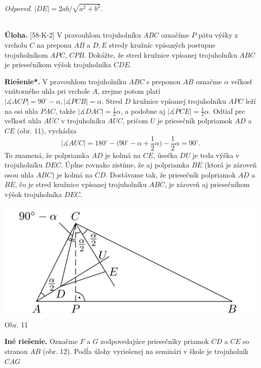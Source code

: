 \documentclass[11pt,a4paper,oneside,final]{book}
\newcommand{\ul}{\textbf{Úloha.} }
\newcommand{\rieh}{\textbf{Riešenie*.} }
\newcommand{\ma}{\measuredangle}
\begin{document}
\textit{Odpoveď.} $|DE| = 2ab/\sqrt{a^2 + b^2}$.\\
\\
\begin{tcolorbox}[breakable,notitle,boxrule=0pt,colback=light-gray,colframe=light-gray]\ul [58-K-2]
V pravouhlom trojuholníku $ABC$ označíme $P$ pätu výšky z vrcholu $C$ na preponu $AB$ a $D, E$ stredy kružníc vpísaných postupne trojuholníkom $APC$, $CPB$. Dokážte, že stred
kružnice vpísanej trojuholníku $ABC$ je priesečníkom výšok trojuholníka $CDE$.

\end{tcolorbox}

\rieh V pravouhlom trojuholníku $ABC$ s preponou $AB$ označme $\alpha$ veľkosť vnútorného uhla pri vrchole $A$, zrejme potom platí $|\ma ACP| = 90^\circ -\alpha, |\ma PCB| = \alpha.$ Stred $D$ kružnice vpísanej trojuholníku $APC$ leží na osi uhla $PAC$, takže $|\ma DAC| = \frac{1}{2}\alpha$, a podobne aj $|\ma PCE| = \frac{1}{2}\alpha$. Odtiaľ pre veľkosť uhla $AUC$ v trojuholníku $AUC$, pričom $U$ je priesečník polpriamok $AD$ a $CE$ (obr. 11), vychádza
$$|\ma AUC| = 180^\circ -\bigg(90^\circ -\alpha + \frac{1}{2}\alpha\bigg) -\frac{1}{2}\alpha = 90^\circ.$$
To znamená, že polpriamka $AD$ je kolmá na $CE$, úsečka $DU$ je teda výška v trojuholníku $DEC$. Úplne rovnako zistíme, že aj polpriamka $BE$ (ktorá je zároveň osou uhla $ABC$) je kolmá na $CD$. Dostávame tak, že priesečník polpriamok $AD$ a $BE$, čo je stred kružnice vpísanej trojuholníku $ABC$, je zároveň aj priesečníkom výšok trojuholníka $DEC$.
\begin{center}
\includegraphics[scale=0.3]{58K21}\\

Obr. 11
\end{center}
\textbf{Iné riešenie.} Označme $F$ a $G$ zodpovedajúce priesečníky priamok $CD$ a $CE$ so stranou $AB$ (obr. 12). Podĺa úlohy vyriešenej na seminári v škole je trojuholník $CAG$
\end{document}
